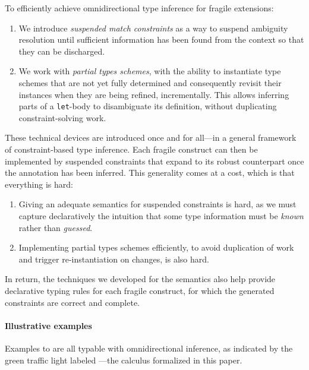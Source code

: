 \documentclass[acmsmall,screen,nonacm,review]{acmart}
\begin{document}
To efficiently achieve omnidirectional type inference for fragile \ML
extensions:
\begin{enumerate}

\item
  We introduce \emph{suspended match constraints} as a way to suspend
  ambiguity resolution until sufficient information has been found from the
  context so that they can be discharged.

\item
  We work with \emph{partial types schemes}, \ie with the ability to
  instantiate type
  schemes that are not yet fully determined and consequently revisit their
  instances when they are being refined, incrementally. This allows
  inferring parts of a \texttt{let}-body to disambiguate its definition,
  without duplicating constraint-solving work.

\end{enumerate}

These technical devices are introduced once and for all---in a general
framework of constraint-based type inference. Each fragile \ML construct can
then be implemented by suspended constraints that expand to its robust
counterpart once the annotation has been inferred. This generality comes at
a cost, which is that everything is hard:
\begin{enumerate}

\item
  Giving an adequate semantics for suspended constraints is hard, as we
  must capture declaratively the intuition that some type information must be
  \emph{known} rather than \emph{guessed}.

\item
  Implementing partial types schemes efficiently, to avoid duplication of
  work and trigger re-instantiation on changes, is also hard.

\end{enumerate}
In return, the techniques we developed for the semantics
also help provide declarative typing rules for each fragile
construct, for which the generated constraints are correct and
complete.

\paragraph{Illustrative examples}

Examples  to  are all typable with omnidirectional
inference, as indicated by the green traffic light labeled \OML---the
calculus formalized in this paper.
\end{document}
